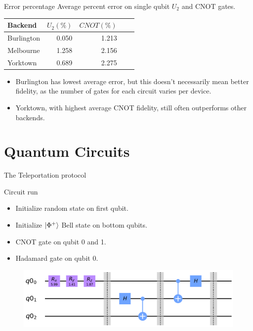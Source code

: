 \begin{frame}{Error percentage}
Average percent error on single qubit $U_2$ and CNOT gates.
\vspace{0.5cm}
\begin{table} \centering
	\begin{tabular}{lrrrr} \toprule Backend & $U_2 (\%)$ & $CNOT (\%)$ \\ \midrule
		Burlington & 0.050 & 1.213 \\ Melbourne & 1.258 & 2.156 \\ Yorktown & 0.689 &
		2.275 \\ \bottomrule
	\end{tabular}
	\label{tb:average_errors}
\end{table}
\vspace{0.5cm}
\begin{itemize}
  \item Burlington has lowest average error, but this doesn't necessarily mean
better fidelity, as the number of gates for each circuit varies per device.
  \item Yorktown, with highest average CNOT fidelity, still often outperforms other
backends.
\end{itemize}
\end{frame}

\section{Quantum Circuits}

\begin{frame}{The Teleportation protocol}
	
	\begin{block}{Circuit run}
		\begin{itemize}
			\item Initialize random state on first qubit.
			\item Initialize $\ket{\Phi^+}$ Bell state on bottom qubits.
			\item CNOT gate on qubit 0 and 1.
			\item Hadamard gate on qubit 0.
		\end{itemize}
	\end{block}
	
	\begin{figure}[h] \centering
		\includegraphics[width=\textwidth]{images/teleport_circuit.png}
		\label{fig:tele_circ}
	\end{figure}

\end{frame}

